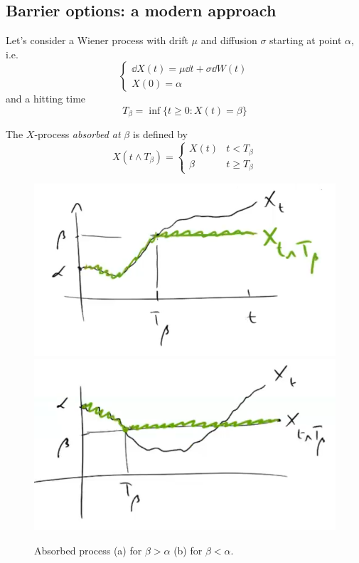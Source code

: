 \subsection{Barrier options: a modern approach} %
Let's consider a Wiener process with drift $\mu$ and diffusion $\sigma$ starting at point $\alpha$, i.e.
\begin{equation}
    \begin{cases}
    \dd X(t) = \mu \dd t + \sigma \dd W(t) \\
    X(0) = \alpha
    \end{cases}
\end{equation}
and a hitting time
\begin{equation}
    T_{\beta} = \inf\{t\ge0:X(t)=\beta\}
\end{equation}
\begin{definition}
    The $X$-process \emph{absorbed at} $\beta$ is defined by
    \begin{equation}
        X(t\wedge T_{\beta}) = \begin{cases}
        X(t) & t < T_{\beta} \\
        \beta & t \ge T_{\beta}
        \end{cases}
    \end{equation}
\end{definition}
\begin{figure}[h]
    \centering
    \includegraphics[scale=0.25]{fig/tmp/fig37.png}
    \includegraphics[scale=0.25]{fig/tmp/fig38.png}
    \caption{Absorbed process (a) for $\beta>\alpha$ (b) for $\beta<\alpha$.}
    \label{fig:absproc}
\end{figure}
